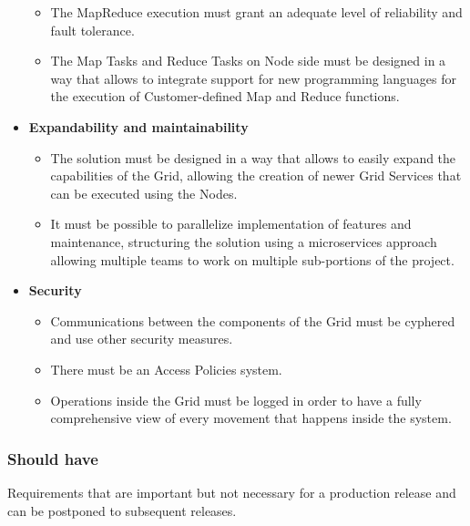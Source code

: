 \begin{itemize}
\begin{itemize}
        \item The MapReduce execution must grant an adequate level of reliability and fault tolerance.
        \item The Map Tasks and Reduce Tasks on Node side must be designed in a way that allows to integrate support for new programming languages for the execution of Customer-defined Map and Reduce functions.
    \end{itemize}
    \item \textbf{Expandability and maintainability}
    \begin{itemize}
        \item The solution must be designed in a way that allows to easily expand the capabilities of the Grid, allowing the creation of newer Grid Services that can be executed using the Nodes.
        \item It must be possible to parallelize implementation of features and maintenance, structuring the solution using a microservices approach allowing multiple teams to work on multiple sub-portions of the project.
    \end{itemize}
    \item \textbf{Security}
    \begin{itemize}
        \item Communications between the components of the Grid must be cyphered and use other security measures.
        \item There must be an Access Policies system.
        \item Operations inside the Grid must be logged in order to have a fully comprehensive view of every movement that happens inside the system.
    \end{itemize}
\end{itemize}

\subsubsection{Should have}
Requirements that are important but not necessary for a production release and can be postponed to subsequent releases.

